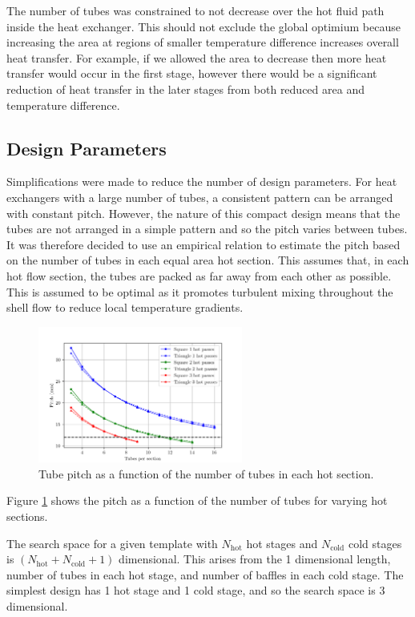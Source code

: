 \documentclass{article}
\begin{document}
The number of tubes was constrained to not decrease over the hot fluid path inside the heat exchanger.
This should not exclude the global optimium because increasing the area at regions of smaller temperature difference increases overall heat transfer.
For example, if we allowed the area to decrease then more heat transfer would occur in the first stage,
however there would be a significant reduction of heat transfer in the later stages from both reduced area and temperature difference.

\subsection{Design Parameters}

Simplifications were made to reduce the number of design parameters.
For heat exchangers with a large number of tubes, a consistent pattern can be arranged with constant pitch.
However, the nature of this compact design means that the tubes are not arranged in a simple pattern and so the pitch varies between tubes.
It was therefore decided to use an empirical relation to estimate the pitch based on the number of tubes in each equal area hot section.
This assumes that, in each hot flow section, the tubes are packed as far away from each other as possible.
This is assumed to be optimal as it promotes turbulent mixing throughout the shell flow to reduce local temperature gradients.

\begin{figure}[H]
  \centering
  \includegraphics[width=0.6\textwidth]{pitch_vs_tubes.png}
  \caption{Tube pitch as a function of the number of tubes in each hot section.}
  \label{fig:pitch_vs_tubes}
\end{figure}

Figure \ref{fig:pitch_vs_tubes} shows the pitch as a function of the number of tubes for varying hot sections. 

The search space for a given template with $N_\text{hot}$ hot stages and $N_\text{cold}$ cold stages is $(N_\text{hot} + N_\text{cold} + 1)$ dimensional.
This arises from the 1 dimensional length, number of tubes in each hot stage, and number of baffles in each cold stage.
The simplest design has 1 hot stage and 1 cold stage, and so the search space is 3 dimensional.
\end{document}
